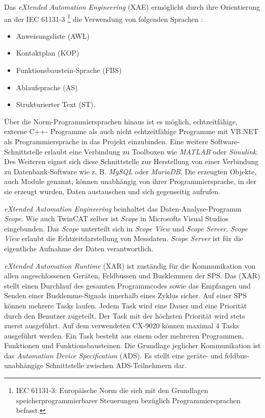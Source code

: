 Das \textit{eXtended Automation Engineering} (XAE) ermöglicht durch ihre Orientierung an der IEC 61131-3 \footnote{IEC 61131-3:  Europäische Norm die sich mit den Grundlagen speicherprogrammierbarer Steuerungen bezüglich Programmiersprachen befasst.} die Verwendung von folgenden Sprachen :

\begin{itemize}
\item	Anweisungsliste (AWL)
\item	Kontaktplan (KOP)
\item 	Funktionsbaustein-Sprache (FBS)
\item	Ablaufsprache (AS)
\item	Strukturierter Text (ST).
\end{itemize}

Über die Norm-Programmiersprachen hinaus ist es möglich, echtzeitfähige, externe C++- Programme als auch nicht echtzeitfähige Programme mit VB.NET  als Programmiersprache in das Projekt einzubinden. Eine weitere Software-Schnittstelle erlaubt eine Verbindung zu  Toolboxen wie \textit{MATLAB} oder \textit{Simulink}. Des Weiteren eignet sich diese Schnittstelle zur Herstellung von einer Verbindung zu Datenbank-Software wie z. B.\textit{ MySQL} oder \textit{MariaDB}. Die erzeugten Objekte, auch Module genannt, können unabhängig von ihrer Programmiersprache, in der sie erzeugt wurden,  Daten austauschen und sich gegenseitig aufrufen. 

\textit{eXtended Automation Engineering} beinhaltet das Daten-Analyse-Programm \textit{Scope}. Wie auch TwinCAT selber ist \textit{Scope} in Microsofts Visual Studios eingebunden. Das \textit{Scope} unterteilt sich in \textit{Scope View} und \textit{Scope Server}. \textit{Scope View} erlaubt die Echtzeitdarstellung von Messdaten.  \textit{Scope Server} ist für die eigentliche Aufnahme der Daten verantwortlich.


\textit{eXtended Automation Runtime} (XAR) ist zuständig für die Kommunikation von allen angeschlossenen Geräten, Feldbussen und Busklemmen der SPS. Das (XAR) stellt einen Durchlauf des gesamten Programmcodes sowie das Empfangen und Senden einer Busklemme-Signals innerhalb eines Zyklus sicher. Auf einer SPS können mehrere Tasks laufen. Jedem Task wird eine Dauer und eine Priorität durch den Benutzer zugeteilt. Der Task mit der höchsten Priorität wird stets zuerst ausgeführt. Auf dem verwendeten CX-9020 können maximal 4 Tasks ausgeführt werden. Ein Task besteht aus einem oder mehreren Programmen, Funktionen und Funktionsbausteinen.  Die Grundlage jeglicher Kommunikation ist das \textit{Automation Device Specification} (ADS). Es stellt eine geräte- und feldbus-unabhängige Schnittstelle zwischen ADS-Teilnehmern dar. 
